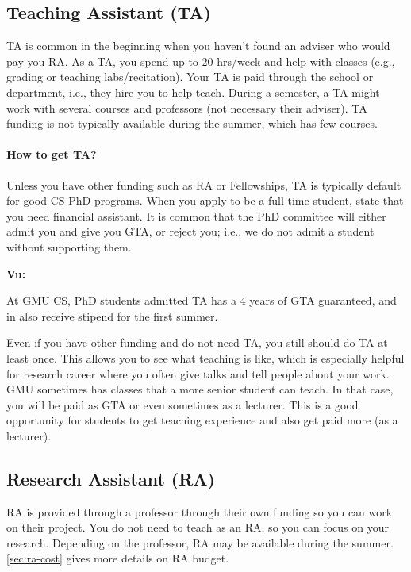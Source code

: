 \documentclass[oneside,11pt]{memoir}
\newenvironment{commentbox}[1][]{
  \small
  \begin{mybox}
    {\small \textbf{#1}}
  }{
  \end{mybox}
}
\begin{document}
\subsection{Teaching Assistant (TA)}\label{sec:ta}

TA is common in the beginning when you haven't found an adviser who would pay you RA. As a TA, you spend up to 20 hrs/week and help with classes (e.g., grading or teaching labs/recitation). Your TA is paid through the school or department, i.e., they hire you to help teach.  During a semester, a TA might work with several courses and professors (not necessary their adviser).  TA funding is not typically available during the summer, which has few courses.

\paragraph{How to get TA?}  Unless you have other funding such as RA or Fellowships, TA is typically default for good CS PhD programs. When you apply to be a full-time student,  state that you need financial assistant. It is common that the PhD committee will either admit you and give you GTA, or reject you; i.e., we do not admit a student without supporting them.  

\begin{commentbox}[Vu:]
  At GMU CS, PhD students admitted TA has a 4 years of GTA guaranteed, and in also receive  stipend for the first summer.
\end{commentbox}

Even if you have other funding and do not need TA, you still should do TA at least once.  This allows you to see what teaching is like, which is especially helpful for research career where you often give talks and tell people about your work. GMU sometimes has classes that a more senior student can teach.  In that case, you will be paid as GTA or even sometimes as a lecturer.  This is a good opportunity for students to get teaching experience and also get paid more (as a lecturer).

\subsection{Research Assistant (RA)}
RA is provided through a professor through their own funding so you can work on their project.  
You do not need to teach as an RA, so you can focus on your research. Depending on the professor, RA may be available during the summer. \autoref{sec:ra-cost} gives more details on RA budget.
\end{document}
